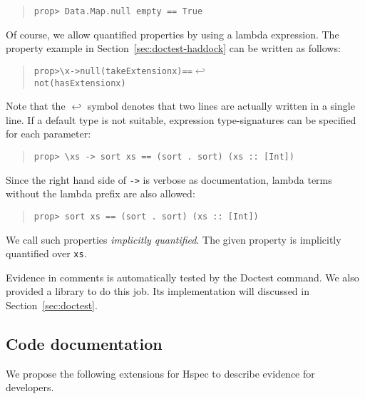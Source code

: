 \documentclass[preprint]{sigplanconf}
\begin{document}
\begin{quote}
\small
\begin{verbatim}
prop> Data.Map.null empty == True
\end{verbatim}
\end{quote}

\noindent Of course, we allow quantified properties by using a
lambda expression. The property example in Section~\ref{sec:doctest-haddock}
can be written as follows:

\begin{quote}
\small
\begin{alltt}
prop> \verb|\|x -> null (takeExtension x) == \(\hookleftarrow\)
            not (hasExtension x)
\end{alltt}
\end{quote}

\noindent Note that the $\hookleftarrow$ symbol denotes that two lines are actually written in a single line. If a default type is not suitable, expression type-signatures can be specified for each parameter:

\begin{quote}
\small
\begin{verbatim}
prop> \xs -> sort xs == (sort . sort) (xs :: [Int])
\end{verbatim}
\end{quote}

\noindent Since the right hand side of {\tt ->} is verbose as documentation,
lambda terms without the lambda prefix are also allowed:

\begin{quote}
\small
\begin{verbatim}
prop> sort xs == (sort . sort) (xs :: [Int])
\end{verbatim}
\end{quote}

\noindent We call such properties \emph{implicitly quantified}.  The
given property is implicitly quantified over \verb|xs|.

Evidence in comments is automatically
tested by the Doctest command. We also provided a library
to do this job. Its implementation will discussed in Section~\ref{sec:doctest}.

\subsection{Code documentation}
\label{sec:code-doc}

We propose the following extensions for Hspec to
describe evidence for developers.
\end{document}
